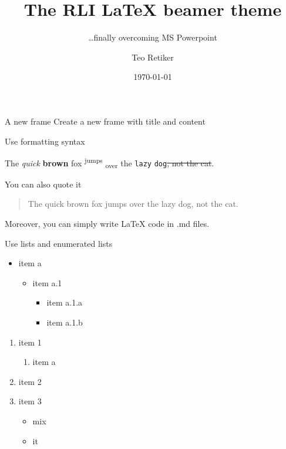 \documentclass[ignorenonframetext,aspectratio=169]{beamer}
\title{The RLI \LaTeX{} beamer theme}
\subtitle{\ldots finally overcoming MS Powerpoint}
\author{Teo Retiker}
\date{\today}
\institute{Reiner Lemoine Institut}
\begin{document}
\frame{\titlepage}

\begin{frame}[fragile]{A new frame}
Create a new frame with title and content

\end{frame}

\begin{frame}[fragile]{Use formatting syntax}

The \emph{quick} \textbf{brown} fox \textsuperscript{jumps}
\textsubscript{over} the \texttt{lazy} \texttt{dog}\sout{, not the cat}.

You can also quote it

\begin{quote}
The quick brown fox jumps over the lazy dog, not the cat.
\end{quote}

Moreover, you can simply write \LaTeX{} code in .md files.

\end{frame}

\begin{frame}{Use lists and enumerated lists}

\begin{itemize}
\item item a

  \begin{itemize}
  \item item a.1

    \begin{itemize}
    \item item a.1.a
    \item item a.1.b
    \end{itemize}
  \end{itemize}
\end{itemize}

\begin{enumerate}
\item item 1

  \begin{enumerate}
  \item item a
  \end{enumerate}
\item item 2
\item item 3

  \begin{itemize}
  \item mix
  \item it
  \end{itemize}
\end{enumerate}

\end{frame}
\end{document}
